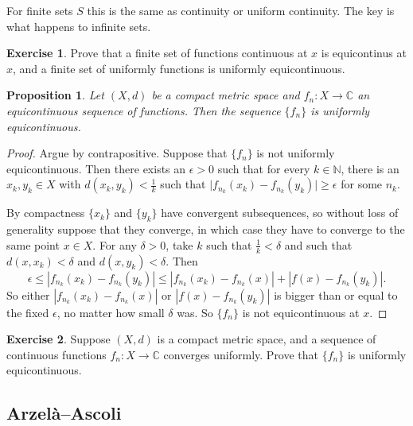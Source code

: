 \documentclass[12pt,openany]{book}
\newcommand{\sabs}[1]{\lvert {#1} \rvert}
\newcommand{\abs}[1]{\left\lvert {#1} \right\rvert}
\newcommand{\C}{{\mathbb{C}}}
\newcommand{\N}{{\mathbb{N}}}
\theoremstyle{plain}
\newtheorem{prop}[thm]{Proposition}
\theoremstyle{remark}
\theoremstyle{definition}
\newenvironment{exbox}{%
    \def\FrameCommand{\vrule width 1pt \relax\hspace{10pt}}%
    \MakeFramed{\advance\hsize-\width\FrameRestore}%
}{%
    \endMakeFramed
}
\theoremstyle{exercise}
\newtheorem{exercise}{Exercise}[section]
\theoremstyle{example}
\begin{document}
For finite sets $S$ this is the same as continuity or uniform continuity.  The
key is what happens to infinite sets.

\begin{exbox}
\begin{exercise}
Prove that a finite set of functions continuous at $x$ is
equicontinus at $x$, and
a finite set of uniformly functions is uniformly equicontinuous.
\end{exercise}
\end{exbox}

\begin{prop}
Let $(X,d)$ be a compact metric space and
$f_n \colon X \to \C$ an equicontinuous sequence of functions.
Then the sequence $\{ f_n \}$ is uniformly equicontinuous.
\end{prop}

\begin{proof}
Argue by contrapositive.  Suppose that $\{ f_n \}$ is not
uniformly equicontinuous.  Then there exists an $\epsilon > 0$
such that for every $k \in \N$, there
is an $x_k,y_k \in X$ with $d(x_k,y_k) < \frac{1}{k}$
such that $\sabs{f_{n_k}(x_k)-f_{n_k}(y_k)} \geq \epsilon$ for some $n_k$.

By compactness $\{x_k\}$ and $\{ y_k\}$ have convergent subsequences, so
without loss of generality suppose that they converge, in which case
they have to converge to the same point $x \in X$.
For any $\delta > 0$, take $k$ such that $\frac{1}{k} < \delta$ and
such that $d(x,x_k) < \delta$ and
$d(x,y_k) < \delta$.  Then
\begin{equation*}
\epsilon \leq 
\abs{f_{n_k}(x_k)-f_{n_k}(y_k)}
\leq
\abs{f_{n_k}(x_k)-f_{n_k}(x)} + \abs{f(x)-f_{n_k}(y_k)} .
\end{equation*}
So either 
$\abs{f_{n_k}(x_k)-f_{n_k}(x)}$ or $\abs{f(x)-f_{n_k}(y_k)}$ is
bigger than or equal to the fixed $\epsilon$, no matter how small $\delta$
was.  So $\{ f_n \}$ is not equicontinuous at $x$.
\end{proof}

\begin{exbox}
\begin{exercise}
Suppose $(X,d)$ is a compact metric space,
and a sequence of continuous functions $f_n \colon X \to \C$
converges uniformly. Prove that $\{ f_n \}$ is uniformly equicontinuous.
\end{exercise}
\end{exbox}

\subsection{Arzel\`a--Ascoli}
\end{document}
